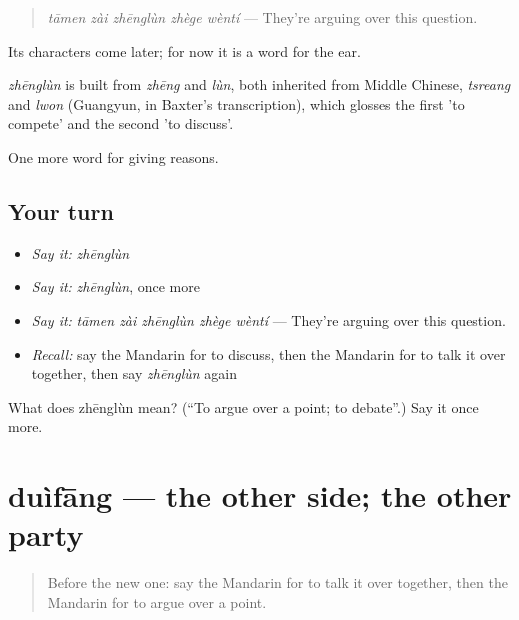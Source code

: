 \begin{quote}
\emph{tāmen zài zhēnglùn zhège wèntí} — They're arguing over this question.
\end{quote}

Its characters come later; for now it is a word for the ear.

\begin{cousinweb}
\emph{zhēnglùn} is built from \emph{zhēng} and \emph{lùn}, both inherited from Middle Chinese, \emph{tsreang} and \emph{lwon} (Guangyun, in Baxter's transcription), which glosses the first 'to compete' and the second 'to discuss'.
\end{cousinweb}

\begin{grammarlens}[title={What you've built}]
One more word for giving reasons.
\end{grammarlens}

\subsection*{Your turn}
\begin{itemize}
\raggedright
  \item \emph{Say it:} \emph{zhēnglùn}
  \item \emph{Say it:} \emph{zhēnglùn}, once more
  \item \emph{Say it:} \emph{tāmen zài zhēnglùn zhège wèntí} — They're arguing over this question.
  \item \emph{Recall:} say the Mandarin for to discuss, then the Mandarin for to talk it over together, then say \emph{zhēnglùn} again
\end{itemize}

\begin{tcolorbox}[breakable,colback=teal!4,colframe=teal!35!black,title={Before you move on}]
What does zhēnglùn mean? (\textquotedblleft{}To argue over a point; to debate\textquotedblright{}.) Say it once more.
\end{tcolorbox}
\section[duìfāng]{duìfāng — the other side; the other party}

\label{lesson:ZH-C348-duifang}



\begin{quote}
Before the new one: say the Mandarin for to talk it over together, then the Mandarin for to argue over a point.
\end{quote}

